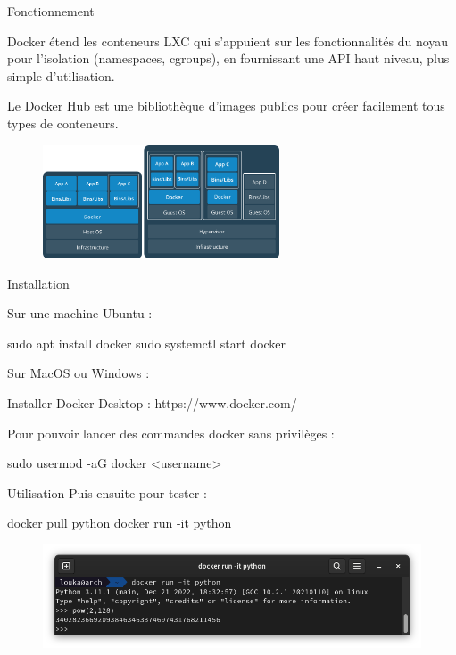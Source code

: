 \documentclass{cubeamer}
\begin{document}
\begin{frame}{Fonctionnement}
    \begin{multicols}{2}
    Docker étend les conteneurs LXC qui s'appuient sur les fonctionnalités du noyau pour
    l'isolation (namespaces, cgroups), en fournissant une API haut niveau, plus simple
    d'utilisation.

    Le Docker Hub est une bibliothèque d'images publics pour créer facilement tous
    types de conteneurs.
    
    \columnbreak
    \begin{figure}
        \centering
        \includegraphics[width=7cm]{img/vm-container}
    \end{figure}    

    \end{multicols}
\end{frame}

\begin{frame}[fragile]{Installation}
    \begin{multicols}{2}
Sur une machine Ubuntu :
\begin{bashResized}{0.48}
sudo apt install docker
sudo systemctl start docker
\end{bashResized}
    \columnbreak
    
Sur MacOS ou Windows :
\begin{bashResized}{0.48}
Installer Docker Desktop :
https://www.docker.com/
\end{bashResized}
    \end{multicols}

    Pour pouvoir lancer des commandes docker sans privilèges :
\begin{bash}
sudo usermod -aG docker <username>
\end{bash}
\end{frame}

\begin{frame}[fragile]{Utilisation}
    Puis ensuite pour tester :
\begin{bash}
docker pull python
docker run -it python
\end{bash}

    \begin{figure}
        \centering
        \includegraphics[width=\textwidth]{img/docker-test.png}
    \end{figure}
\end{frame}
\end{document}

